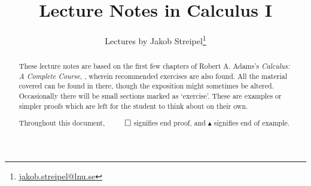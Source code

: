 \documentclass[english, a4paper]{article}
\title{Lecture Notes in Calculus I}
\author{Lectures by Jakob Streipel\thanks{\href{mailto:jakob.streipel@lnu.se}{jakob.streipel@lnu.se}}}
\date{}
\begin{document}

\maketitle

\begin{abstract}
	\noindent
	These lecture notes are based on the first few chapters of Robert A. Adams's \emph{Calculus: A Complete Course}, \cite{Adams2013}, wherein recommended exercises are also found. All the material covered can be found in there, though the exposition might sometimes be altered. Occasionally there will be small sections marked as `exercise'. These are examples or simpler proofs which are left for the student to think about on their own.  

	\vspace{1em}

	\noindent
	Throughout this document, $\qed$ signifies end proof, and $\blacktriangle$ signifies end of example.
\end{abstract}

\tableofcontents

\cleardoublepage
{}

\setcounter{section}{-1}









\label{lec2:continuity}

















\end{document}
